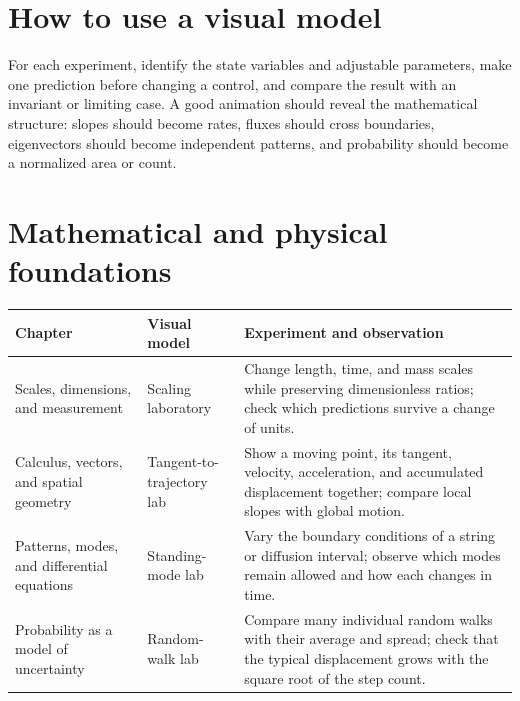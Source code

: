 \documentclass[11pt,oneside]{book}
\theoremstyle{reviewstyle}
\begin{document}
\section{How to use a visual model}
For each experiment, identify the state variables and adjustable parameters, make one prediction before changing a control, and compare the result with an invariant or limiting case. A good animation should reveal the mathematical structure: slopes should become rates, fluxes should cross boundaries, eigenvectors should become independent patterns, and probability should become a normalized area or count.

\section{Mathematical and physical foundations}
\begin{longtable}{p{}p{}p{}}
\toprule Chapter & Visual model & Experiment and observation\\ \midrule
\endhead
Scales, dimensions, and measurement & Scaling laboratory & Change length, time, and mass scales while preserving dimensionless ratios; check which predictions survive a change of units.\\
Calculus, vectors, and spatial geometry & Tangent-to-trajectory lab & Show a moving point, its tangent, velocity, acceleration, and accumulated displacement together; compare local slopes with global motion.\\
Patterns, modes, and differential equations & Standing-mode lab & Vary the boundary conditions of a string or diffusion interval; observe which modes remain allowed and how each changes in time.\\
Probability as a model of uncertainty & Random-walk lab & Compare many individual random walks with their average and spread; check that the typical displacement grows with the square root of the step count.\\
\bottomrule
\end{longtable}
\end{document}
